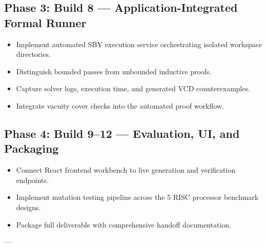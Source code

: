 \documentclass[11pt,a4paper]{article}
\begin{document}
\subsection{Phase 3: Build 8 --- Application-Integrated Formal Runner}
\begin{itemize}[noitemsep]
    \item Implement automated SBY execution service orchestrating isolated workspace directories.
    \item Distinguish bounded passes from unbounded inductive proofs.
    \item Capture solver logs, execution time, and generated VCD counterexamples.
    \item Integrate vacuity cover checks into the automated proof workflow.
\end{itemize}

\subsection{Phase 4: Build 9--12 --- Evaluation, UI, and Packaging}
\begin{itemize}[noitemsep]
    \item Connect React frontend workbench to live generation and verification endpoints.
    \item Implement mutation testing pipeline across the 5 RISC processor benchmark designs.
    \item Package full deliverable with comprehensive handoff documentation.
\end{itemize}

---



\end{document}
